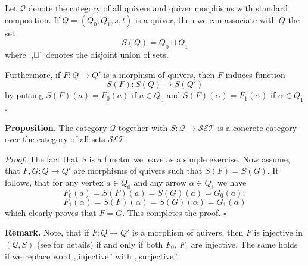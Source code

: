 \documentclass[12pt]{article}
\begin{document}
Let $\mathcal{Q}$ denote the category of all quivers and quiver morphisms with standard composition. If $Q=(Q_0,Q_1,s,t)$ is a quiver, then we can associate with $Q$ the set
$$S(Q)=Q_0\sqcup Q_1$$
where ,,$\sqcup$'' denotes the disjoint union of sets.

Furthermore, if $F:Q\to Q'$ is a morphism of quivers, then $F$ induces function
$$S(F):S(Q)\to S(Q')$$
by putting $S(F)(a)=F_0(a)$ if $a\in Q_0$ and $S(F)(\alpha)=F_1(\alpha)$ if $\alpha\in Q_1$.

\textbf{Proposition.} The category $\mathcal{Q}$ together with $S:\mathcal{Q}\to\mathcal{SET}$ is a concrete category over the category of all sets $\mathcal{SET}$.

\textit{Proof.} The fact that $S$ is a functor we leave as a simple exercise. Now assume, that $F,G:Q\to Q'$ are morphisms of quivers such that $S(F)=S(G)$. It follows, that for any vertex $a\in Q_0$ and any arrow $\alpha\in Q_1$ we have
$$F_0(a)=S(F)(a)=S(G)(a)=G_0(a);$$
$$F_1(\alpha)=S(F)(\alpha)=S(G)(\alpha)=G_1(\alpha)$$
which clearly proves that $F=G$. This completes the proof. $\square$

\textbf{Remark.} Note, that if $F:Q\to Q'$ is a morphism of quivers, then $F$ is injective in $(\mathcal{Q}, S)$ (see  for details) if and only if both $F_0$, $F_1$ are injective. The same holds if we replace word ,,injective'' with ,,surjective''.
\end{document}
